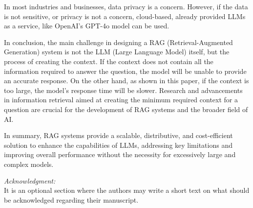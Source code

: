 \documentclass{wseas}
\begin{document}
In most industries and businesses, data privacy is a concern. However,
if the data is not sensitive, or privacy is not a concern, cloud-based,
already provided LLMs as a service, like OpenAI's GPT-4o model can be used.

In conclusion, the main challenge in designing a RAG (Retrieval-Augmented Generation) 
system is not the LLM (Large Language Model) itself, but the process of creating the context. 
If the context does not contain all the information required to answer the question, 
the model will be unable to provide an accurate response. On the other hand, as shown in this paper, 
if the context is too large, the model's response time will be slower. Research and advancements 
in information retrieval aimed at creating the minimum required context for a question are crucial 
for the development of RAG systems and the broader field of AI.

In summary, RAG systems provide a scalable, distributive, and
cost-efficient solution to enhance the capabilities of LLMs, addressing
key limitations and improving overall performance without the necessity
for excessively large and complex models.

\flushleft \par{\textit {Acknowledgment:}}\\
It is an optional section where the authors may write a short text on what should be acknowledged regarding their manuscript.
\end{document}
